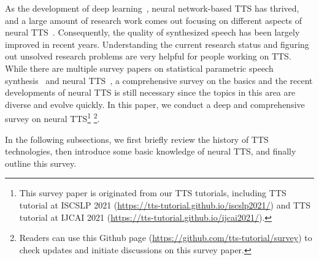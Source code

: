 \documentclass{article}
\begin{document}
As the development of deep learning~\cite{lecun2015deep,goodfellow2016deep}, neural network-based TTS has thrived, and a large amount of research work comes out focusing on different aspects of neural TTS~\cite{zen2013statistical,oord2016wavenet,wang2017tacotron,shen2018natural,kalchbrenner2018efficient,ping2018deep,li2019neural,ren2019fastspeech}. Consequently, the quality of synthesized speech has been largely improved in recent years. Understanding the current research status and figuring out unsolved research problems are very helpful for people working on TTS. While there are multiple survey papers on statistical parametric speech synthesis~\cite{black2007statistical,zen2009statistical,tokuda2013speech,zen2015acoustic} and neural TTS~\cite{tabet2011speech,mali2014survey,siddhi2017survey,ning2019review,hsu2019towards,panda2020survey,mu2021review}, a comprehensive survey on the basics and the recent developments of neural TTS is still necessary since the topics in this area are diverse and evolve quickly. In this paper, we conduct a deep and comprehensive survey on neural TTS\footnote{This survey paper is originated from our TTS tutorials, including TTS tutorial at ISCSLP 2021 (\url{https://tts-tutorial.github.io/iscslp2021/}) and TTS tutorial at IJCAI 2021 (\url{https://tts-tutorial.github.io/ijcai2021/}).} \footnote{Readers can use this Github page (\url{https://github.com/tts-tutorial/survey}) to check updates and initiate discussions on this survey paper.}. 

In the following subsections, we first briefly review the history of TTS technologies, then introduce some basic knowledge of neural TTS, and finally outline this survey.
\end{document}
